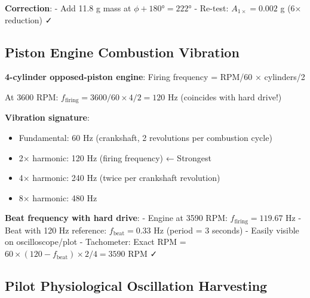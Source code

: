 \documentclass[12pt,a4paper]{article}
\begin{document}
\textbf{Correction}:
- Add 11.8 g mass at $\phi + 180° = 222°$
- Re-test: $A_{1\times} = 0.002$ g (6× reduction) ✓

\subsection{Piston Engine Combustion Vibration}

\textbf{4-cylinder opposed-piston engine}: Firing frequency = RPM/60 × cylinders/2

At 3600 RPM: $f_{\text{firing}} = 3600/60 \times 4/2 = 120$ Hz (coincides with hard drive!)

\textbf{Vibration signature}:
\begin{itemize}
\item Fundamental: 60 Hz (crankshaft, 2 revolutions per combustion cycle)
\item 2× harmonic: 120 Hz (firing frequency) ← Strongest
\item 4× harmonic: 240 Hz (twice per crankshaft revolution)
\item 8× harmonic: 480 Hz
\end{itemize}

\textbf{Beat frequency with hard drive}:
- Engine at 3590 RPM: $f_{\text{firing}} = 119.67$ Hz
- Beat with 120 Hz reference: $f_{\text{beat}} = 0.33$ Hz (period = 3 seconds)
- Easily visible on oscilloscope/plot
- Tachometer: Exact RPM = $60 \times (120 - f_{\text{beat}}) \times 2/4 = 3590$ RPM ✓

\subsection{Pilot Physiological Oscillation Harvesting}
\end{document}
